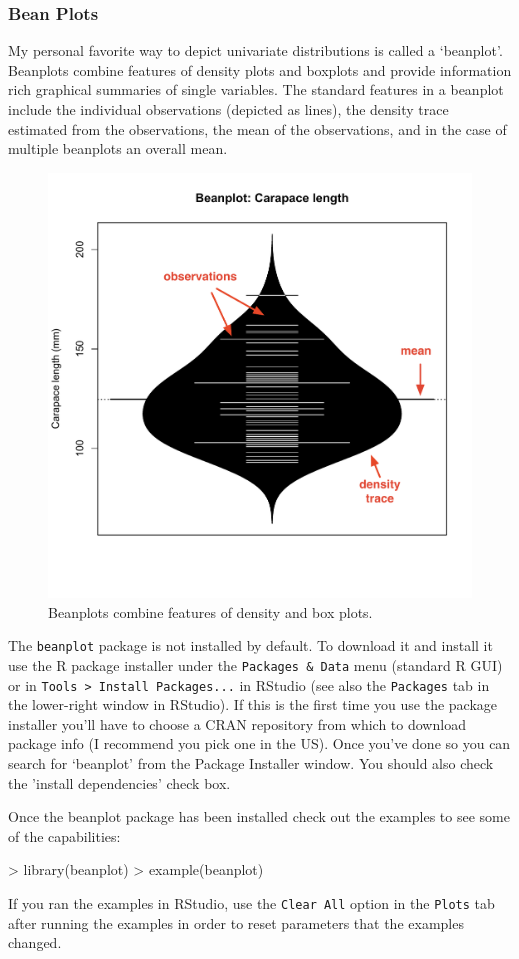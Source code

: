 \subsubsection{Bean Plots}

My personal favorite way to depict univariate distributions is called a
`beanplot'. Beanplots combine features of density plots and boxplots and
provide information rich graphical summaries of single variables. The
standard features in a beanplot include the individual observations
(depicted as lines), the density trace estimated from the observations,
the mean of the observations, and in the case of multiple beanplots an
overall mean.

\begin{figure}[htbp]
\centering
\includegraphics[width=0.5\columnwidth]{./figures/hands-on2/beanplot-labeled.pdf}
\caption{Beanplots combine features of density and box plots.}
\end{figure}

The \lstinline!beanplot! package is not installed by default. To
download it and install it use the R package installer under the
\lstinline!Packages & Data! menu (standard R GUI) or in
\lstinline!Tools > Install Packages...! in RStudio (see also the
\lstinline!Packages! tab in the lower-right window in RStudio). If this
is the first time you use the package installer you'll have to choose a
CRAN repository from which to download package info (I recommend you
pick one in the US). Once you've done so you can search for `beanplot'
from the Package Installer window. You should also check the 'install
dependencies' check box.

Once the beanplot package has been installed check out the examples to
see some of the capabilities:

\begin{R}
> library(beanplot) 
> example(beanplot)    
\end{R}
If you ran the examples in RStudio, use the \lstinline!Clear All! option
in the \lstinline!Plots! tab after running the examples in order to
reset parameters that the examples changed.


